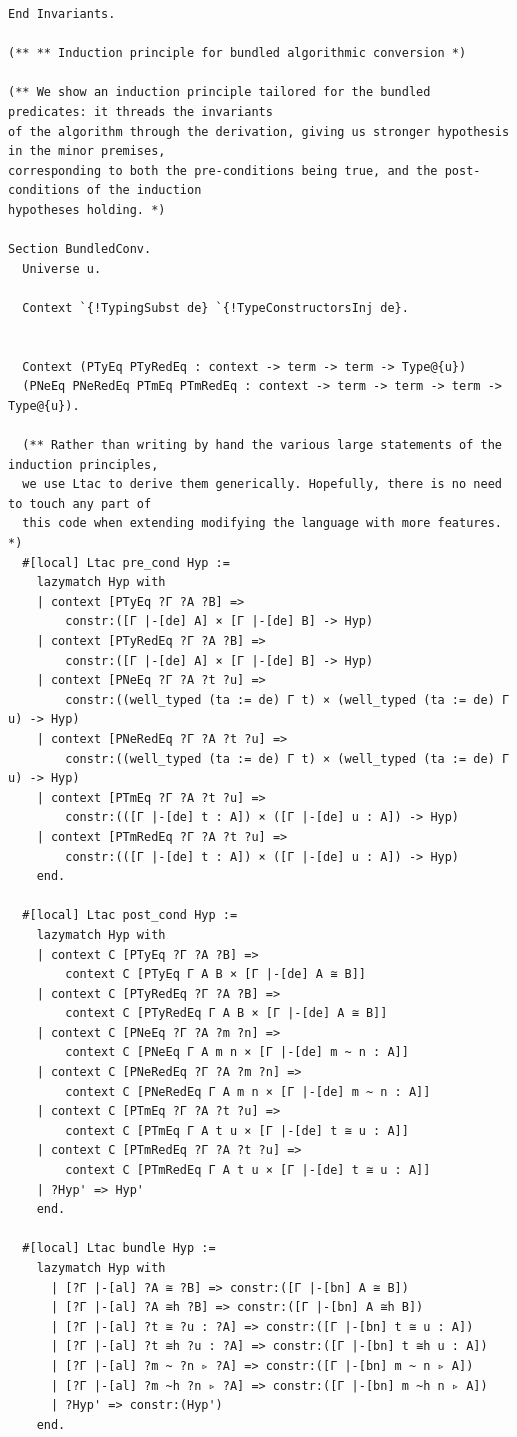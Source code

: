 \documentclass[10pt,a4paper]{amsart}
\begin{document}
\begin{lstlisting}
End Invariants.

(** ** Induction principle for bundled algorithmic conversion *)

(** We show an induction principle tailored for the bundled predicates: it threads the invariants
of the algorithm through the derivation, giving us stronger hypothesis in the minor premises,
corresponding to both the pre-conditions being true, and the post-conditions of the induction
hypotheses holding. *)

Section BundledConv.
  Universe u.

  Context `{!TypingSubst de} `{!TypeConstructorsInj de}.


  Context (PTyEq PTyRedEq : context -> term -> term -> Type@{u})
  (PNeEq PNeRedEq PTmEq PTmRedEq : context -> term -> term -> term -> Type@{u}).

  (** Rather than writing by hand the various large statements of the induction principles,
  we use Ltac to derive them generically. Hopefully, there is no need to touch any part of
  this code when extending modifying the language with more features. *)
  #[local] Ltac pre_cond Hyp :=
    lazymatch Hyp with
    | context [PTyEq ?Γ ?A ?B] =>
        constr:([Γ |-[de] A] × [Γ |-[de] B] -> Hyp)
    | context [PTyRedEq ?Γ ?A ?B] =>
        constr:([Γ |-[de] A] × [Γ |-[de] B] -> Hyp)
    | context [PNeEq ?Γ ?A ?t ?u] =>
        constr:((well_typed (ta := de) Γ t) × (well_typed (ta := de) Γ u) -> Hyp)
    | context [PNeRedEq ?Γ ?A ?t ?u] =>
        constr:((well_typed (ta := de) Γ t) × (well_typed (ta := de) Γ u) -> Hyp)
    | context [PTmEq ?Γ ?A ?t ?u] =>
        constr:(([Γ |-[de] t : A]) × ([Γ |-[de] u : A]) -> Hyp)
    | context [PTmRedEq ?Γ ?A ?t ?u] =>
        constr:(([Γ |-[de] t : A]) × ([Γ |-[de] u : A]) -> Hyp)
    end.

  #[local] Ltac post_cond Hyp :=
    lazymatch Hyp with
    | context C [PTyEq ?Γ ?A ?B] =>
        context C [PTyEq Γ A B × [Γ |-[de] A ≅ B]]
    | context C [PTyRedEq ?Γ ?A ?B] =>
        context C [PTyRedEq Γ A B × [Γ |-[de] A ≅ B]]
    | context C [PNeEq ?Γ ?A ?m ?n] =>
        context C [PNeEq Γ A m n × [Γ |-[de] m ~ n : A]]
    | context C [PNeRedEq ?Γ ?A ?m ?n] =>
        context C [PNeRedEq Γ A m n × [Γ |-[de] m ~ n : A]]
    | context C [PTmEq ?Γ ?A ?t ?u] =>
        context C [PTmEq Γ A t u × [Γ |-[de] t ≅ u : A]]
    | context C [PTmRedEq ?Γ ?A ?t ?u] =>
        context C [PTmRedEq Γ A t u × [Γ |-[de] t ≅ u : A]]
    | ?Hyp' => Hyp'
    end.

  #[local] Ltac bundle Hyp :=
    lazymatch Hyp with
      | [?Γ |-[al] ?A ≅ ?B] => constr:([Γ |-[bn] A ≅ B])
      | [?Γ |-[al] ?A ≅h ?B] => constr:([Γ |-[bn] A ≅h B])
      | [?Γ |-[al] ?t ≅ ?u : ?A] => constr:([Γ |-[bn] t ≅ u : A])
      | [?Γ |-[al] ?t ≅h ?u : ?A] => constr:([Γ |-[bn] t ≅h u : A])
      | [?Γ |-[al] ?m ~ ?n ▹ ?A] => constr:([Γ |-[bn] m ~ n ▹ A])
      | [?Γ |-[al] ?m ~h ?n ▹ ?A] => constr:([Γ |-[bn] m ~h n ▹ A])
      | ?Hyp' => constr:(Hyp')
    end.


\end{lstlisting}
\end{document}
